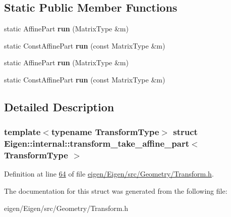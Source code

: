 \subsection*{Static Public Member Functions}
\begin{DoxyCompactItemize}
\item 
\mbox{\label{struct_eigen_1_1internal_1_1transform__take__affine__part_ab03cd5d7709d05188bd6348d1ca97e02}} 
static Affine\+Part {\bfseries run} (Matrix\+Type \&m)
\item 
\mbox{\label{struct_eigen_1_1internal_1_1transform__take__affine__part_a0096db051d90c94fe74f0a0def1fc5f1}} 
static Const\+Affine\+Part {\bfseries run} (const Matrix\+Type \&m)
\item 
\mbox{\label{struct_eigen_1_1internal_1_1transform__take__affine__part_ab03cd5d7709d05188bd6348d1ca97e02}} 
static Affine\+Part {\bfseries run} (Matrix\+Type \&m)
\item 
\mbox{\label{struct_eigen_1_1internal_1_1transform__take__affine__part_a0096db051d90c94fe74f0a0def1fc5f1}} 
static Const\+Affine\+Part {\bfseries run} (const Matrix\+Type \&m)
\end{DoxyCompactItemize}


\subsection{Detailed Description}
\subsubsection*{template$<$typename Transform\+Type$>$\newline
struct Eigen\+::internal\+::transform\+\_\+take\+\_\+affine\+\_\+part$<$ Transform\+Type $>$}



Definition at line \hyperlink{eigen_2_eigen_2src_2_geometry_2_transform_8h_source_l00064}{64} of file \hyperlink{eigen_2_eigen_2src_2_geometry_2_transform_8h_source}{eigen/\+Eigen/src/\+Geometry/\+Transform.\+h}.



The documentation for this struct was generated from the following file\+:\begin{DoxyCompactItemize}
\item 
eigen/\+Eigen/src/\+Geometry/\+Transform.\+h\end{DoxyCompactItemize}
